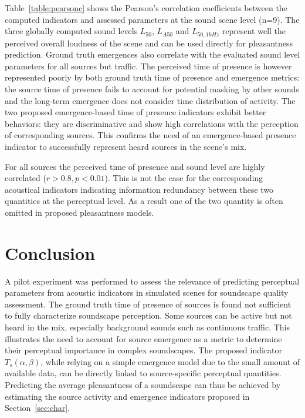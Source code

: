 \documentclass{article}
\begin{document}
\begin{sloppy}
Table~\ref{table:pearsonc} shows the Pearson's correlation coefficients between the computed indicators and assessed parameters at the sound scene level (n=9). The three globally computed sound levels $L_{50}$, $L_{A50}$ and $L_{50,1kHz}$ represent well the perceived overall loudness of the scene and can be used directly for pleasantness prediction. Ground truth emergences also correlate with the evaluated sound level parameters for all sources but traffic. The perceived time of presence is however represented poorly by both ground truth time of presence and emergence metrics: the source time of presence fails to account for potential masking by other sounds and the long-term emergence does not consider time distribution of activity. The two proposed emergence-based time of presence indicators exhibit better behaviors: they are discriminative and show high correlations with the perception of corresponding sources. This confirms the need of an emergence-based presence indicator to successfully represent heard sources in the scene's mix.

For all sources the perceived time of presence and sound level are highly correlated ($r>0.8, p<0.01$). This is not the case for the corresponding acoustical indicators indicating information redundancy between these two quantities at the perceptual level. As a result one of the two quantity is often omitted in proposed pleasantness models.

\section{Conclusion}
\label{sec:disc}

A pilot experiment was performed to assess the relevance of predicting perceptual parameters from acoustic indicators in simulated scenes for soundscape quality assessment. The ground truth time of presence of sources is found not sufficient to fully characterize soundscape perception. Some sources can be active but not heard in the mix, especially background sounds such as continuous traffic. This illustrates the need to account for source emergence as a metric to determine their perceptual importance in complex soundscapes. The proposed indicator $T_s(\alpha, \beta)$, while relying on a simple emergence model due to the small amount of available data, can be directly linked to source-specific perceptual quantities. Predicting the average pleasantness of a soundscape can thus be achieved by estimating the source activity and emergence indicators proposed in Section~\ref{sec:char}.


\end{sloppy}
\end{document}
